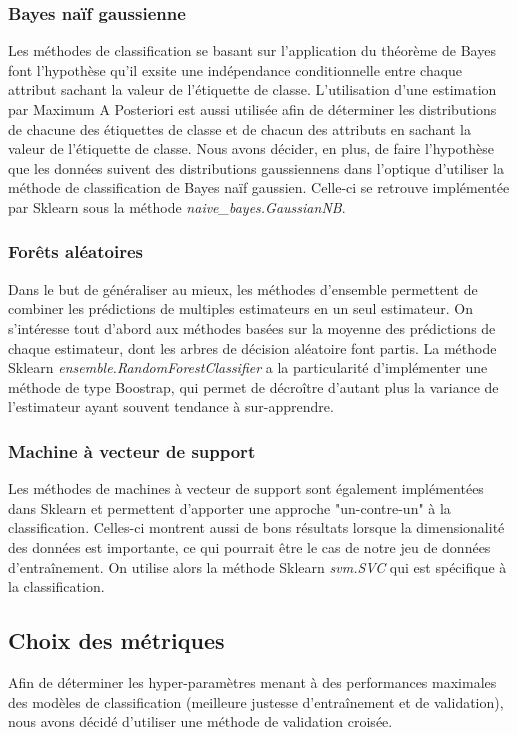 \subsubsection*{Bayes naïf gaussienne}
Les méthodes de classification se basant sur l'application du théorème de Bayes font l'hypothèse qu'il exsite une indépendance conditionnelle entre chaque attribut sachant la valeur de l'étiquette de classe. L'utilisation d'une estimation par Maximum A Posteriori est aussi utilisée afin de déterminer les distributions de chacune des étiquettes de classe et de chacun des attributs en sachant la valeur de l'étiquette de classe. Nous avons décider, en plus, de faire l'hypothèse que les données suivent des distributions gaussiennens dans l'optique d'utiliser la méthode de classification de Bayes naïf gaussien. Celle-ci se retrouve implémentée par Sklearn sous la méthode \emph{naive\_bayes.GaussianNB}.

\subsubsection*{Forêts aléatoires}
Dans le but de généraliser au mieux, les méthodes d'ensemble permettent de combiner les prédictions de multiples estimateurs en un seul estimateur. On s'intéresse tout d'abord aux méthodes basées sur la moyenne des prédictions de chaque estimateur, dont les arbres de décision aléatoire font partis. 
La méthode Sklearn \emph{ensemble.RandomForestClassifier} a la particularité d'implémenter une méthode de type Boostrap, qui permet de décroître d'autant plus la variance de l'estimateur ayant souvent tendance à sur-apprendre.

\subsubsection*{Machine à vecteur de support}
Les méthodes de machines à vecteur de support sont également implémentées dans Sklearn et permettent d'apporter une approche "un-contre-un" à la classification. Celles-ci montrent aussi de bons résultats lorsque la dimensionalité des données est importante, ce qui pourrait être le cas de notre jeu de données d'entraînement. On utilise alors la méthode Sklearn \emph{svm.SVC} qui est spécifique à la classification.

\subsection{Choix des métriques}
Afin de déterminer les hyper-paramètres menant à des performances maximales des modèles de classification (meilleure justesse d'entraînement et de validation), nous avons décidé d'utiliser une méthode de validation croisée. 


